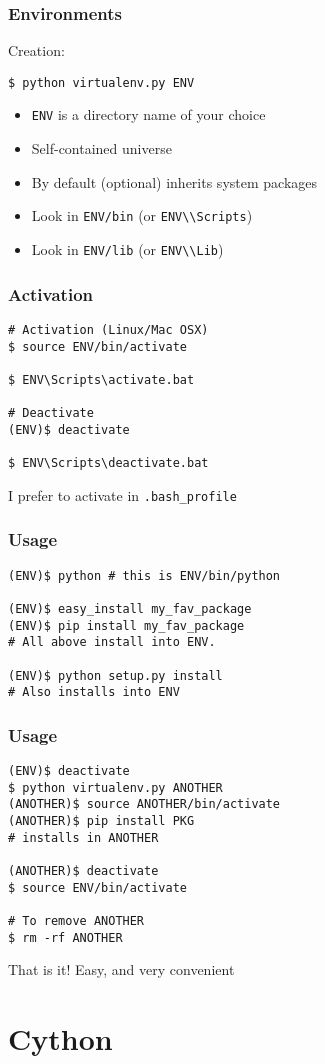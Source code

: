\documentclass[14pt,compress]{beamer}
\newcommand{\typ}[1]{\lstinline{#1}}
\begin{document}
\begin{frame}[fragile]
  \frametitle{Environments}
Creation:

  \begin{lstlisting}
$ python virtualenv.py ENV
  \end{lstlisting}

  \begin{itemize}
      \item \typ{ENV} is a directory name of your choice
      \item Self-contained universe
      \item By default (optional) inherits system packages
      \item Look in \typ{ENV/bin} (or \typ{ENV\\Scripts})

      \item Look in \typ{ENV/lib} (or \typ{ENV\\Lib})
  \end{itemize}

\end{frame}

\begin{frame}[fragile]
  \frametitle{Activation}

  \begin{lstlisting}
# Activation (Linux/Mac OSX)
$ source ENV/bin/activate

$ ENV\Scripts\activate.bat

# Deactivate
(ENV)$ deactivate

$ ENV\Scripts\deactivate.bat
  \end{lstlisting}
  \vspace*{0.1in}
  I prefer to activate in \typ{.bash_profile}
\end{frame}

\begin{frame}[fragile]
  \frametitle{Usage}
  \begin{lstlisting}
(ENV)$ python # this is ENV/bin/python

(ENV)$ easy_install my_fav_package
(ENV)$ pip install my_fav_package
# All above install into ENV.

(ENV)$ python setup.py install
# Also installs into ENV

  \end{lstlisting}

\end{frame}

\begin{frame}[fragile]
  \frametitle{Usage}
  \begin{lstlisting}
(ENV)$ deactivate
$ python virtualenv.py ANOTHER
(ANOTHER)$ source ANOTHER/bin/activate
(ANOTHER)$ pip install PKG
# installs in ANOTHER

(ANOTHER)$ deactivate
$ source ENV/bin/activate

# To remove ANOTHER
$ rm -rf ANOTHER
\end{lstlisting}

That is it! Easy, and very convenient
\end{frame}



\section{Cython}
\end{document}
